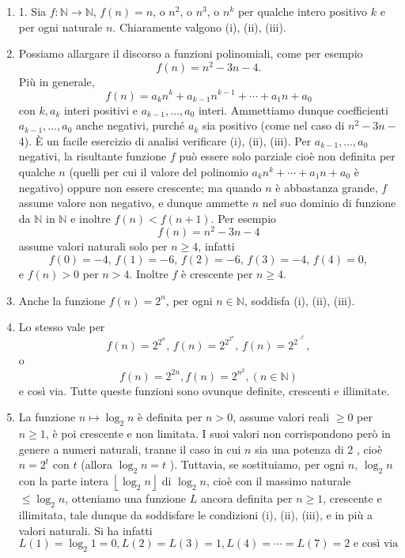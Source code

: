 \begin{enumerate}
    \item 1. Sia $f: \mathbb{N} \rightarrow \mathbb{N}$, $f(n)=n$, o $n^2$, o $n^3$, o
          $n^k$ per qualche intero positivo $k$ e per ogni naturale $n$. Chiaramente
          valgono (i), (ii), (iii).
    \item Possiamo allargare il discorso a funzioni
          polinomiali, come per esempio
          $$
              f(n)=n^2-3 n-4 .
          $$
          Più in generale,
          $$
              f(n)=a_k n^k+a_{k-1} n^{k-1}+\cdots+a_1 n+a_0
          $$
          con $k, a_k$ interi positivi e $a_{k-1}, \ldots, a_0$ interi. Ammettiamo dunque
          coefficienti $a_{k-1}, \ldots, a_0$ anche negativi, purché $a_k$ sia positivo
          (come nel caso di $n^2-3 n-$ 4). È un facile esercizio di analisi verificare
          (i), (ii), (iii). Per $a_{k-1}, \ldots, a_0$ negativi, la risultante funzione
          $f$ può essere solo parziale cioè non definita per qualche $n$ (quelli per cui
          il valore del polinomio $a_k n^k+\cdots+a_1 n+a_0$ è negativo) oppure non essere
          crescente; ma quando $n$ è abbastanza grande, $f$ assume valore non negativo, e
          dunque ammette $n$ nel suo dominio di funzione da $\mathbb{N}$ in $\mathbb{N}$ e
          inoltre $f(n)<f(n+1)$. Per esempio
          $$
              f(n)=n^2-3 n-4
          $$
          assume valori naturali solo per $n \geq 4$, infatti
          $$
              f(0)=-4 \text{, } f(1)=-6 \text{, } f(2)=-6 \text{, } f(3)=-4 \text{, } f(4)=0,
          $$
          e $f(n)>0$ per $n>4$. Inoltre $f$ è crescente per $n \geq 4$.
    \item Anche la
          funzione $f(n)=2^n$, per ogni $n \in \mathbb{N}$, soddisfa (i), (ii), (iii).
    \item Lo stesso vale per
          $$
              f(n)=2^{2^n} \text{, } f(n)=2^{2^{2^n}} \text{, } f(n)=2^{2^{\iddots^{2^n}}},
          $$
          o
          $$
              f(n)=2^{2 n}, f(n)=2^{n^2},(n \in \mathbb{N})
          $$
          e così via. Tutte queste funzioni sono ovunque definite, crescenti e illimitate.
    \item La funzione $n \mapsto \log _2 n$ è definita per $n>0$, assume valori reali
          $\geq 0$ per $n \geq 1$, è poi crescente e non limitata. I suoi valori non
          corrispondono però in genere a numeri naturali, tranne il caso in cui $n$ sia
          una potenza di 2 , cioè $n=2^t$ con $t$ (allora $\log _2 n=t$ ). Tuttavia, se
          sostituiamo, per ogni $n$, $\log _2 n$ con la parte intera $\left\lfloor\log _2
              n\right\rfloor$ di $\log _2 n$, cioè con il massimo naturale $\leq \log _2 n$,
          otteniamo una funzione $L$ ancora definita per $n \geq 1$, crescente e
          illimitata, tale dunque da soddisfare le condizioni (i), (ii), (iii), e in più a
          valori naturali. Si ha infatti
          $$
              L(1)=\log _2 1=0, L(2)=L(3)=1, L(4)=\cdots=L(7)=2 \text { e così via }
          $$
\end{enumerate}

